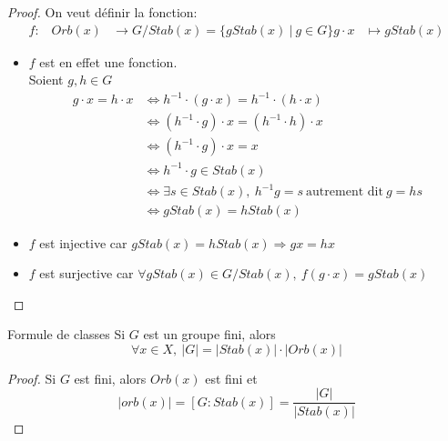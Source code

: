 \documentclass[../main.tex]{subfile}
\begin{document}
\begin{proof}
	On veut définir la fonction:
	$$
\begin{aligned}
	f : \phantom{...} Orb(x) &\to G/Stab(x) = \{g Stab(x) \ | \ g \in G\}
	g \cdot x &\mapsto g Stab(x)
\end{aligned}
	$$
\begin{itemize}	
	\item
	$f$ est en effet une fonction.\\
	Soient $g,h \in G$\\
	$$
\begin{aligned}
	g \cdot x = h \cdot x &\Leftrightarrow h^{-1} \cdot (g \cdot x) = h^{-1} \cdot (h \cdot x)\\
	&\Leftrightarrow (h^{-1} \cdot g) \cdot x = (h^{-1} \cdot h) \cdot x\\
	&\Leftrightarrow (h^{-1} \cdot g) \cdot x = x\\
	&\Leftrightarrow h^{-1} \cdot g \in Stab(x)\\
	&\Leftrightarrow \exists s \in Stab(x), \ h^{-1}g = s \ \text{autrement dit} \ g = hs\\
	&\Leftrightarrow g Stab(x) = h Stab(x)
\end{aligned}
	$$

	\item $f$ est injective car $g Stab(x) = h Stab(x) \Rightarrow gx = hx$

	\item $f$ est surjective car $\forall g Stab(x) \in G / Stab(x), \ f(g \cdot x) = g Stab(x)$
\end{itemize}
\end{proof}

\begin{corrol}{Formule de classes}
	Si $G$ est un groupe fini, alors 
	$$\forall x \in X, \ |G| = |Stab(x)| \cdot |Orb(x)|$$
\end{corrol}

\begin{proof}
	Si $G$ est fini, alors $Orb(x)$ est fini et 
	$$|orb(x)| = [G : Stab(x)] = \frac{|G|}{|Stab(x)|}$$
\end{proof}
\end{document}

